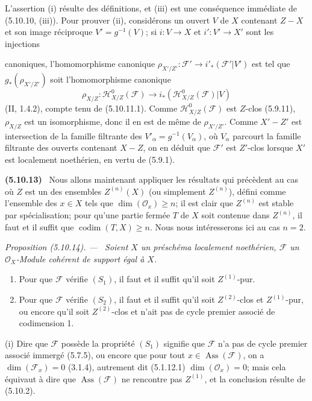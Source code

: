 \documentclass[10pt,oneside]{book}
\newcommand{\oldpage}[2][]{%
  \setcounter{footnote}{0}%
  \marginpar{\scriptsize\textbf{#1}~|~#2}\ignorespaces}
\newenvironment{env}[1][]{\par\medskip\noindent\textbf{(#1)}\ }{\par}
\newenvironment{proposition}[1][]{%
  \par\medskip\noindent\itshape Proposition (#1). ---\ }{\par}
\begin{document}
L'assertion (i) résulte des définitions, et (iii) est une conséquence immédiate
de (5.10.10, (iii)). Pour prouver (ii), considérons un ouvert $V$ de $X$
contenant $Z-X$ et son image réciproque $V'=g^{-1}(V)$; si $i:V\to X$ et
$i':V'\to X'$ sont les injections

\oldpage[IV-2]{119}

canoniques, l'homomorphisme canonique
$\rho_{X'/Z'}:\mathcal F'\to i'_*(\mathcal F'|V')$ est tel que
$g_*(\rho_{X'/Z'})$ soit l'homomorphisme canonique
\[
\rho_{X/Z}:\mathcal H^0_{X/Z}(\mathcal F)
\longrightarrow i_*(\mathcal H^0_{X/Z}(\mathcal F)|V)
\]
(II, 1.4.2), compte tenu de (5.10.11.1). Comme
$\mathcal H^0_{X/Z}(\mathcal F)$ est $Z$-clos (5.9.11), $\rho_{X/Z}$ est un
isomorphisme, donc il en est de même de $\rho_{X'/Z'}$. Comme $X'-Z'$ est
intersection de la famille filtrante des $V'_\alpha=g^{-1}(V_\alpha)$, où
$V_\alpha$ parcourt la famille filtrante des ouverts contenant $X-Z$, on en
déduit que $\mathcal F'$ est $Z'$-clos lorsque $X'$ est localement noethérien,
en vertu de (5.9.1).

\begin{env}[5.10.13]
\label{IV.2.s5.10.13-fr}
Nous allons maintenant appliquer les résultats qui précèdent au cas où $Z$ est
un des ensembles $Z^{(n)}(X)$ (ou simplement $Z^{(n)}$), défini comme
l'ensemble des $x\in X$ tels que $\dim(\mathcal O_x)\geq n$; il est clair que
$Z^{(n)}$ est stable par spécialisation; pour qu'une partie fermée $T$ de $X$
soit contenue dans $Z^{(n)}$, il faut et il suffit que
$\operatorname{codim}(T,X)\geq n$. Nous nous intéresserons ici au cas $n=2$.
\end{env}

\begin{proposition}[5.10.14]
\label{IV.2.s5.10.14-fr}
Soient $X$ un préschéma localement noethérien, $\mathcal F$ un
$\mathcal O_X$-Module cohérent de support égal à $X$.
\begin{enumerate}
\item[(i)] Pour que $\mathcal F$ vérifie $(S_1)$, il faut et il suffit qu'il
soit $Z^{(1)}$-pur.
\item[(ii)] Pour que $\mathcal F$ vérifie $(S_2)$, il faut et il suffit qu'il
soit $Z^{(2)}$-clos et $Z^{(1)}$-pur, ou encore qu'il soit $Z^{(2)}$-clos et
n'ait pas de cycle premier associé de codimension 1.
\end{enumerate}
\end{proposition}

(i) Dire que $\mathcal F$ possède la propriété $(S_1)$ signifie que
$\mathcal F$ n'a pas de cycle premier associé immergé (5.7.5), ou encore que
pour tout $x\in\operatorname{Ass}(\mathcal F)$, on a
$\dim(\mathcal F_x)=0$ (3.1.4), autrement dit (5.1.12.1)
$\dim(\mathcal O_x)=0$; mais cela équivaut à dire que
$\operatorname{Ass}(\mathcal F)$ ne rencontre pas $Z^{(1)}$, et la conclusion
résulte de (5.10.2).
\end{document}
